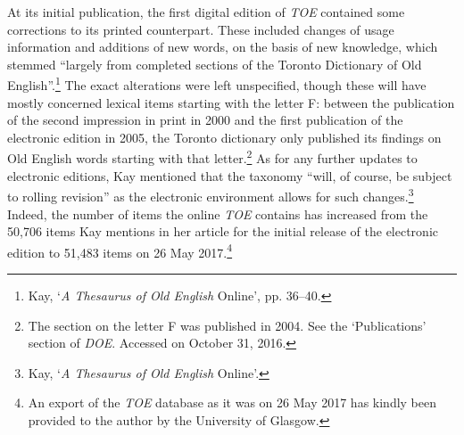At its initial publication, the first digital edition of \textit{TOE} contained some corrections to its printed counterpart. These included changes of usage information and additions of new words, on the basis of new knowledge, which stemmed ``largely from completed sections of the Toronto Dictionary of Old English''.\footnote{Kay, `\textit{A Thesaurus of Old English} Online', pp. 36–40.} The exact alterations were left unspecified, though these will have mostly concerned lexical items starting with the letter F: between the publication of the second impression in print in 2000 and the first publication of the electronic edition in 2005, the Toronto dictionary only published its findings on Old English words starting with that letter.\footnote{The section on the letter F was published in 2004. See the `Publications' section of \textit{DOE}. Accessed on October 31, 2016.} As for any further updates to electronic editions, Kay mentioned that the taxonomy ``will, of course, be subject to rolling revision'' as the electronic environment allows for such changes.\footnote{Kay, `\textit{A Thesaurus of Old English} Online'.} Indeed, the number of items the online \textit{TOE} contains has increased from the 50,706 items Kay mentions in her article for the initial release of the electronic edition to 51,483 items on 26 May 2017.\footnote{An export of the \textit{TOE} database as it was on 26 May 2017 has kindly been provided to the author by the University of Glasgow.} %

